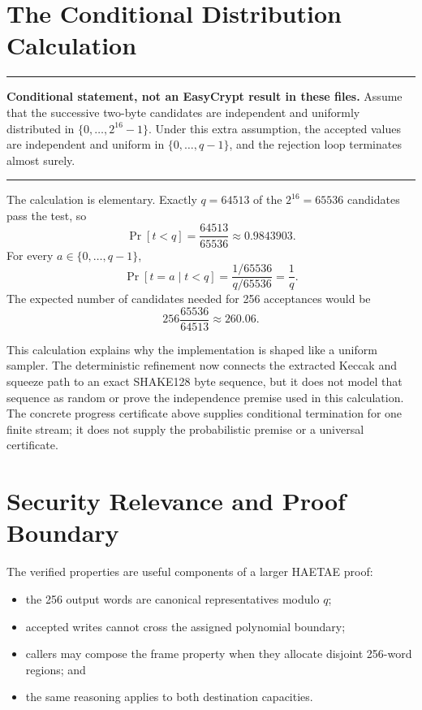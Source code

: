\documentclass[11pt]{article}
\theoremstyle{definition}
\theoremstyle{plain}
\theoremstyle{remark}
\newenvironment{assumptionbox}
  {\begin{center}\begin{minipage}{0.94\linewidth}\color{artifactblue}\hrule\vspace{0.6em}\color{black}}
  {\vspace{0.6em}\color{artifactblue}\hrule\end{minipage}\end{center}}
\begin{document}
\section{The Conditional Distribution Calculation}

\begin{assumptionbox}
\textbf{Conditional statement, not an EasyCrypt result in these files.}
Assume that the successive two-byte candidates are independent and uniformly
distributed in $\{0,\ldots,2^{16}-1\}$.  Under this extra assumption, the
accepted values are independent and uniform in $\{0,\ldots,q-1\}$, and the
rejection loop terminates almost surely.
\end{assumptionbox}

The calculation is elementary.  Exactly $q=64513$ of the $2^{16}=65536$
candidates pass the test, so
\[
  \Pr[t<q]=\frac{64513}{65536}\approx0.9843903.
\]
For every $a\in\{0,\ldots,q-1\}$,
\[
  \Pr[t=a\mid t<q]
  =\frac{1/65536}{q/65536}
  =\frac1q.
\]
The expected number of candidates needed for 256 acceptances would be
\[
  256\frac{65536}{64513}\approx260.06.
\]

This calculation explains why the implementation is shaped like a uniform
sampler.  The deterministic refinement now connects the extracted Keccak and
squeeze path to an exact SHAKE128 byte sequence, but it does not model that
sequence as random or prove the independence premise used in this
calculation.  The concrete progress certificate above supplies conditional
termination for one finite stream; it does not supply the probabilistic premise
or a universal certificate.

\section{Security Relevance and Proof Boundary}

The verified properties are useful components of a larger HAETAE proof:
\begin{itemize}
\item the 256 output words are canonical representatives modulo $q$;
\item accepted writes cannot cross the assigned polynomial boundary;
\item callers may compose the frame property when they allocate disjoint
  256-word regions; and
\item the same reasoning applies to both destination capacities.
\end{itemize}
\end{document}

